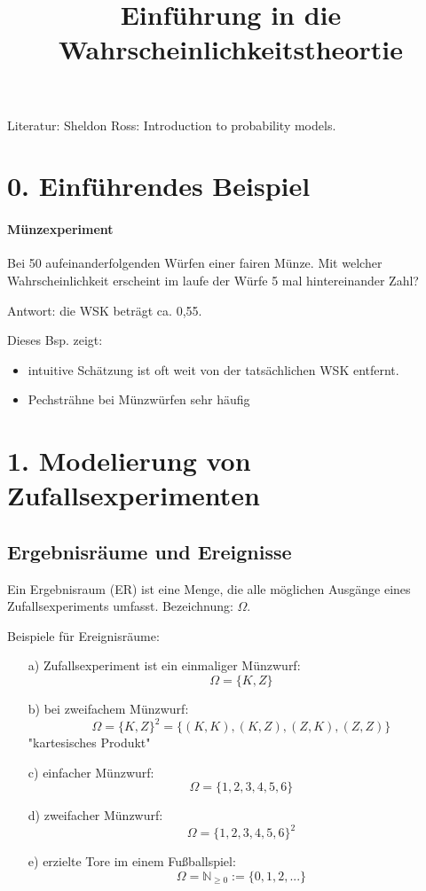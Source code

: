 \documentclass[10pt,a4paper,titlepage]{book}
\title{Einführung in die Wahrscheinlichkeitstheortie}
\begin{document}
\maketitle
\newpage

Literatur: Sheldon Ross: Introduction to probability models.
\section*{0. Einführendes Beispiel}
\paragraph{Münzexperiment}
Bei 50 aufeinanderfolgenden Würfen einer fairen Münze. Mit welcher Wahrscheinlichkeit erscheint im laufe der Würfe 5 mal hintereinander Zahl?

Antwort: die WSK beträgt ca. 0,55.

Dieses Bsp. zeigt:
\begin{itemize}
\item intuitive Schätzung ist oft weit von der tatsächlichen WSK entfernt.
\item Pechsträhne bei Münzwürfen sehr häufig
\end{itemize}
\section*{1. Modelierung von Zufallsexperimenten}
\subsection*{Ergebnisräume und Ereignisse}
Ein Ergebnisraum (ER) ist eine Menge, die alle möglichen Ausgänge eines Zufallsexperiments umfasst.
Bezeichnung: $\Omega$.

Beispiele für Ereignisräume:
\begin{itemize}
\item [a)] Zufallsexperiment ist ein einmaliger Münzwurf:
$$\Omega = \{K, Z\}$$
\item [b)] bei zweifachem Münzwurf:\\
$$\Omega = \{K, Z\}^2 = \{(K,K), (K,Z), (Z,K), (Z,Z)\}$$
"kartesisches Produkt"
\item [c)] einfacher Münzwurf:
$$\Omega = \{1,2,3,4,5,6\}$$
\item [d)] zweifacher Münzwurf:
$$\Omega = \{1,2,3,4,5,6\}^2$$
\item [e)] erzielte Tore im einem Fußballspiel:
$$\Omega =  \mathbb{N}_{\geq 0}:=\{0,1,2,...\}$$
\end{itemize}
\end{document}

